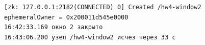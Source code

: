\begin{Verbatim}
[zk: 127.0.0.1:2182(CONNECTED) 0] Created /hw4-window2
ephemeralOwner = 0x200011d545e0000
16:42:33.169 окно 2 закрыто
16:43:06.200 узел /hw4-window2 исчез через 33 с
\end{Verbatim}
